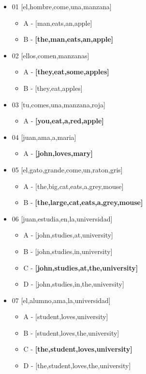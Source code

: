 \documentclass{article}
\begin{document}
\begin{itemize}
    \item 01 [el,hombre,come,una,manzana]
    \begin{itemize}
        \item A - [man,eats,an,apple]
        \item B - \textbf{[the,man,eats,an,apple]}
    \end{itemize}

    \item 02 [ellos,comen,manzanas]
    \begin{itemize}
        \item A - \textbf{[they,eat,some,apples]}
        \item B - [they,eat,apples]
    \end{itemize}

    \item 03 [tu,comes,una,manzana,roja]
    \begin{itemize}
        \item A - \textbf{[you,eat,a,red,apple]}
    \end{itemize}

    \item 04 [juan,ama,a,maria]
    \begin{itemize}
        \item A - \textbf{[john,loves,mary]}
    \end{itemize}

    \item 05 [el,gato,grande,come,un,raton,gris]
    \begin{itemize}
        \item A - [the,big,cat,eats,a,grey,mouse]
        \item B - \textbf{[the,large,cat,eats,a,grey,mouse]}
    \end{itemize}

    \item 06 [juan,estudia,en,la,universidad]
    \begin{itemize}
        \item A - [john,studies,at,university]
        \item B - [john,studies,in,university]
        \item C - \textbf{[john,studies,at,the,university]}
        \item D - [john,studies,in,the,university]
    \end{itemize}

    \item 07 [el,alumno,ama,la,universidad]
    \begin{itemize}
        \item A - [student,loves,university]
        \item B - [student,loves,the,university]
        \item C - \textbf{[the,student,loves,university]}
        \item D - [the,student,loves,the,university]
    \end{itemize}


\end{itemize}
\end{document}
